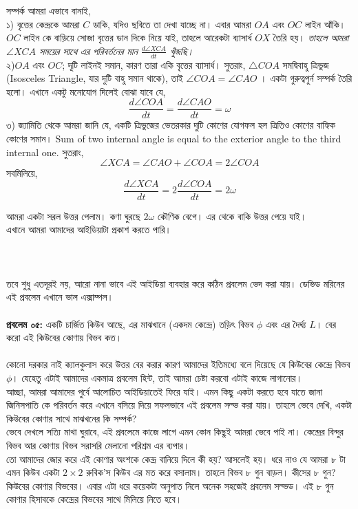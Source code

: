 \documentclass[12pt,a4paper]{article}
\begin{document}
সম্পর্ক আমরা এভাবে বানাই, \\
১) বৃত্তের কেন্দ্রকে আমরা $C$ ডাকি, যদিও ছবিতে তা দেখা যাচ্ছে না। এবার আমরা $OA$ এবং $OC$ লাইন আঁকি। $OC$ লাইন কে বাড়িয়ে সোজা বৃত্তের ডান দিকে নিয়ে যাই, তাহলে আরেকটা ব্যাসার্ধ $OX$ তৈরি হয়। \emph{তাহলে আমরা $\angle XCA$ সময়ের সাথে এর পরিবর্তনের মান $\frac{d \angle XCA}{dt}$ খুঁজছি।}\\
২)$OA$ এবং $OC$; দূটি লাইনই সমান, কারণ তারা একি বৃত্তের ব্যাসার্ধ।  সুতরাং, $\triangle COA$ সমদ্বিবাহু ত্রিভুজ (Isosceles Triangle, যার দুটি বাহু সমান থাকে), তাই $\angle COA = \angle CAO$ । একটা গুরুত্বপুর্ন সম্পর্ক তৈরি হলো। এখানে একটু মনোযোগ দিলেই বোঝা যাবে যে,
 \[ \frac{d \angle COA}{dt} = \frac{d \angle CAO}{dt}= \omega\]
৩) জ্যামিতি থেকে আমরা জানি যে, একটি ত্রিভুজের ভেতরকার দুটি কোণের যোগফল হল ত্রিতিও কোণের বাহ্যিক কোণের সমান। Sum of two internal angle is equal to the exterior angle to the third internal one. সুতরাং,
\[ \angle XCA = \angle CAO + \angle COA = 2 \angle COA \]
সবমিলিয়ে,
 \[ \frac{d \angle XCA}{dt} =
 2\frac{d \angle COA}{dt} = 2 \omega \]
 
 আমরা একটা সরল উত্তর পেলাম। কণা ঘুরছে $2\omega$ কৌণিক বেগে। এর থেকে বাকি উত্তর পেয়ে যাই। \\
এখানে আমরা আমাদের আইডিয়াটা প্রকাশ করতে পারি। \\
\\
\\
\\
তবে শুধু এতদূরই নয়, আরো নানা ভাবে এই আইডিয়া ব্যবহার করে কঠিন প্রবলেম ভেদ করা যায়। ডেভিড মরিনের এই প্রবলেম এখানে ভাল এক্সাম্পল।\\
\\
\textbf{প্রবলেম ০৫:} একটি চার্জিত কিউব আছে, এর মাঝখানে (একদম কেন্দ্রে) তড়িৎ বিভব $\phi$ এবং এর দৈর্ঘ্য $L$। বের করো এই কিউবের কোণায় বিভব কত। \\
\\
কোনো দরকার নাই ক্যালকুলাস করে উত্তর বের করার কারণ আমাদের ইতিমধ্যে বলে দিয়েছে যে কিউবের কেন্দ্রে বিভব $\phi$। যেহেতু এটাই আমাদের একমাত্র প্রবলেম হিন্ট, তাই আমরা চেষ্টা করবো এটাই কাজে লাগানোর। \\
আচ্ছা, আমরা আমাদের পুর্বে আলোচিত আইডিয়াতেই ফিরে যাই। এমন কিছু একটা করতে হবে যাতে জানা জিনিসপাতি কে পরিবর্তন করে এখানে বসিয়ে দিয়ে সফলভাবে এই প্রবলেম সল্ভ করা যায়। তাহলে ভেবে দেখি, একটা কিউবের কোণার সাথে মাঝখনের কি সম্পর্ক?\\
ভেবে দেখলে সত্যি মাথা ঘুরাবে, এই প্রবলেমে কাজে লাগে এমন কোন কিছুই আমরা ভেবে পাই না। কেন্দ্রের বিন্দুর বিভব আর কোণায় বিভব সরাসরি মেলানো পরিশ্রম এর ব্যপার। \\
তো আমাদের জোর করে এই কোণার অংশকে কেন্দ্র বানিয়ে দিলে কী হয়? আসলেই হয়। ধরে নাও যে আমরা ৮ টা এমন কিউব একটা $2 \times 2$ রুবিক'স কিউব এর মত করে বসালাম। তাহলে বিভব ৮ গুন বাড়ল। কীসের ৮ গুন? কিউবের কোণার বিভবের। এবার এটা ধরে কয়েকটা অনুপাত নিলে অনেক সহজেই প্রবলেম সল্ভড। এই ৮ গুন কোণার হিসাবকে কেন্দ্রের বিভবের সাথে মিলিয়ে নিতে হবে। 
\end{document}
